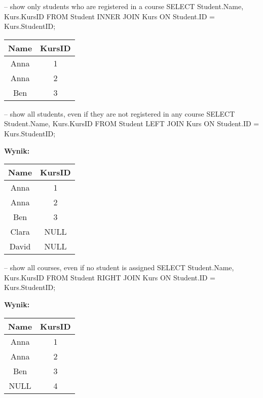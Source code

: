 \begin{sql}
-- show only students who are registered in a course
SELECT Student.Name, Kurs.KursID
    FROM Student
    INNER JOIN Kurs ON Student.ID = Kurs.StudentID;
\end{sql}

\begin{center}
\begin{tabular}{|c|c|}
    \hline
    \textbf{Name} & \textbf{KursID} \\
    \hline
    Anna  & 1 \\
    Anna  & 2 \\
    Ben   & 3 \\
    \hline
\end{tabular}
\end{center}

\begin{sql}
-- show all students, even if they are not registered in any course
SELECT Student.Name, Kurs.KursID
    FROM Student
    LEFT JOIN Kurs ON Student.ID = Kurs.StudentID;
\end{sql}

\textbf{Wynik:}
\begin{center}
\begin{tabular}{|c|c|}
    \hline
    \textbf{Name} & \textbf{KursID} \\
    \hline
    Anna  & 1 \\
    Anna  & 2 \\
    Ben   & 3 \\
    Clara & NULL \\
    David & NULL \\
    \hline
\end{tabular}
\end{center}

\begin{sql}
-- show all courses, even if no student is assigned
SELECT Student.Name, Kurs.KursID
    FROM Student
    RIGHT JOIN Kurs ON Student.ID = Kurs.StudentID;
\end{sql}

\textbf{Wynik:}
\begin{center}
\begin{tabular}{|c|c|}
    \hline
    \textbf{Name} & \textbf{KursID} \\
    \hline
    Anna & 1 \\
    Anna & 2 \\
    Ben  & 3 \\
    NULL & 4 \\ %
    \hline
\end{tabular}
\end{center}


